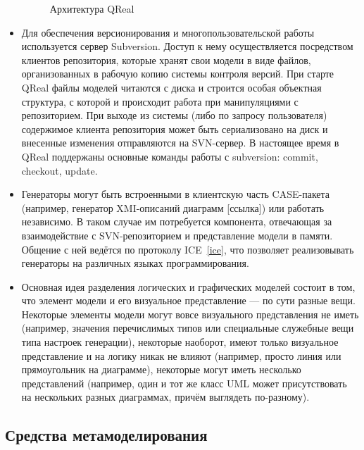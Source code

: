 \documentclass[a4paper]{article}
\begin{document}
\begin{itemize}
\begin{figure} [ht]
\begin{center}
    \caption{Архитектура QReal}
    \label{qRealArchitecture}
  \end{center}
\end{figure}
  \item Для обеспечения версионирования и многопользовательской работы используется сервер Subversion. Доступ к нему осуществляется посредством клиентов репозитория, которые хранят свои модели в виде файлов, организованных в рабочую копию системы контроля версий. При старте QReal файлы моделей читаются с диска и строится особая объектная структура, с которой и происходит работа при манипуляциями с репозиторием. При выходе из системы (либо по запросу пользователя) содержимое клиента репозитория может быть сериализовано на диск и внесенные изменения отправляются на SVN-сервер. В настоящее время в QReal поддержаны основные команды работы с subversion: commit, checkout, update. 
  \item Генераторы могут быть встроенными в клиентскую часть CASE-пакета (например, генератор XMI-описаний диаграмм [ссылка]) или работать независимо. В таком случае им потребуется компонента, отвечающая за взаимодействие с SVN-репозиторием и представление модели в памяти. Общение с ней ведётся по протоколу ICE~\ref{ice}, что позволяет реализовывать генераторы на различных языках программирования.
\item Основная идея разделения логических и графических моделей состоит в том, что элемент модели и его визуальное представление --- по сути разные вещи. Некоторые элементы модели могут вовсе визуального представления не иметь (например, значения перечислимых типов или специальные служебные вещи типа настроек генерации), некоторые наоборот, имеют только визуальное представление и на логику никак не влияют (например, просто линия или прямоугольник на диаграмме), некоторые могут иметь несколько представлений (например, один и тот же класс UML может присутствовать на нескольких разных диаграммах, причём выглядеть по-разному). 
\end{itemize}


\subsection{Средства метамоделирования}
\end{document}

